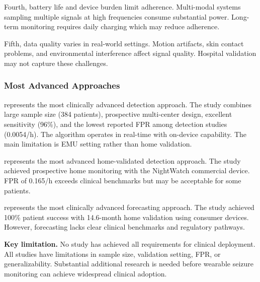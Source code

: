 Fourth, battery life and device burden limit adherence. Multi-modal systems sampling multiple signals at high frequencies consume substantial power. Long-term monitoring requires daily charging which may reduce adherence.

Fifth, data quality varies in real-world settings. Motion artifacts, skin contact problems, and environmental interference affect signal quality. Hospital validation may not capture these challenges.

\subsubsection{Most Advanced Approaches}

\textcite{spahrDeepLearningbasedDetection2025} represents the most clinically advanced detection approach. The study combines large sample size (384 patients), prospective multi-center design, excellent sensitivity (96\%), and the lowest reported FPR among detection studies (0.0054/h). The algorithm operates in real-time with on-device capability. The main limitation is EMU setting rather than home validation.

\textcite{dongTwoLayerEnsembleMethod2022} represents the most advanced home-validated detection approach. The study achieved prospective home monitoring with the NightWatch commercial device. FPR of 0.165/h exceeds clinical benchmarks but may be acceptable for some patients.

\textcite{stirlingForecastingSeizureLikelihood2021} represents the most clinically advanced forecasting approach. The study achieved 100\% patient success with 14.6-month home validation using consumer devices. However, forecasting lacks clear clinical benchmarks and regulatory pathways.

\textbf{Key limitation.} No study has achieved all requirements for clinical deployment. All studies have limitations in sample size, validation setting, FPR, or generalizability. Substantial additional research is needed before wearable seizure monitoring can achieve widespread clinical adoption.
